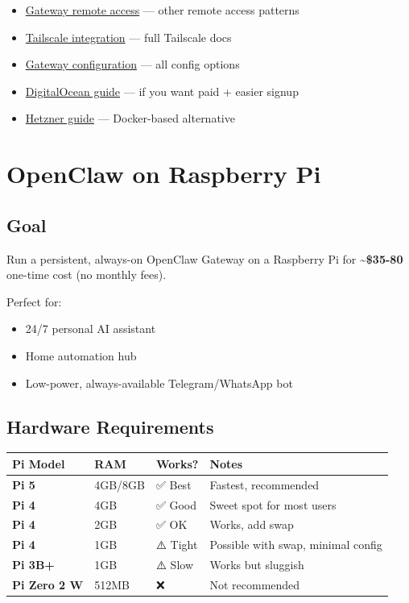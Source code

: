 \begin{itemize}
  \item \href{/gateway/remote}{Gateway remote access} — other remote access patterns
  \item \href{/gateway/tailscale}{Tailscale integration} — full Tailscale docs
  \item \href{/gateway/configuration}{Gateway configuration} — all config options
  \item \href{/platforms/digitalocean}{DigitalOcean guide} — if you want paid + easier signup
  \item \href{/install/hetzner}{Hetzner guide} — Docker-based alternative
\end{itemize}



\clearpage

\section{OpenClaw on Raspberry Pi}


\subsection{Goal}


Run a persistent, always-on OpenClaw Gateway on a Raspberry Pi for \textbf{\textasciitilde{}\$35-80} one-time cost (no monthly fees).

Perfect for:

\begin{itemize}
  \item 24/7 personal AI assistant
  \item Home automation hub
  \item Low-power, always-available Telegram/WhatsApp bot
\end{itemize}


\subsection{Hardware Requirements}



\begin{table}[h]
\centering
\small
\begin{tabular}{|l|l|l|l|}
\hline
Pi Model & RAM & Works? & Notes \\
\hline
\textbf{Pi 5} & 4GB/8GB & ✅ Best & Fastest, recommended \\
\hline
\textbf{Pi 4} & 4GB & ✅ Good & Sweet spot for most users \\
\hline
\textbf{Pi 4} & 2GB & ✅ OK & Works, add swap \\
\hline
\textbf{Pi 4} & 1GB & ⚠️ Tight & Possible with swap, minimal config \\
\hline
\textbf{Pi 3B+} & 1GB & ⚠️ Slow & Works but sluggish \\
\hline
\textbf{Pi Zero 2 W} & 512MB & ❌ & Not recommended \\
\hline
\end{tabular}
\end{table}



